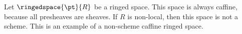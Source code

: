 \begin{example}
Let $\ringedspace{\pt}{R}$ be a ringed space. 
This space is always caffine, because all presheaves are sheaves.
If $R$ is non-local, then this space is not a scheme. 
This is an example of a non-scheme caffine ringed space.
\end{example}
